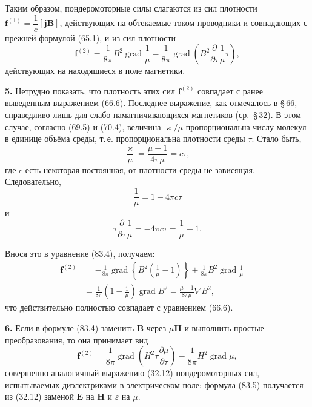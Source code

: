 \documentclass[a4paper,12pt]{article}
\begin{document}

Таким образом, пондеромоторные силы слагаются из сил плотности
$\mathbf{f}^{(1)} = \dfrac{1}{c}[\mathbf{j}\mathbf{B}]$, действующих
на обтекаемые током проводники и совпадающих с прежней формулой (65.1),
и из сил плотности
\begin{equation}
    \mathbf{f}^{(2)} = \frac{1}{8\pi}B^2\operatorname{grad}\frac{1}{\mu}
                     - \frac{1}{8\pi}\operatorname{grad}\!\left(
                         B^2\frac{\partial}{\partial\tau}\frac{1}{\mu}\tau
                     \right),
    \tag{83.4}
\end{equation}
действующих на находящиеся в поле магнетики.

\textbf{5.} Нетрудно показать, что плотность этих сил $\mathbf{f}^{(2)}$
совпадает с ранее выведенным выражением (66.6). Последнее выражение, как
отмечалось в §\,66, справедливо лишь для слабо намагничивающихся
магнетиков (ср.\ §\,32). В этом случае, согласно (69.5) и (70.4),
величина $\varkappa/\mu$ пропорциональна числу молекул в единице объёма
среды, т.\,е. пропорциональна плотности среды $\tau$. Стало быть,
$$
    \frac{\varkappa}{\mu} = \frac{\mu - 1}{4\pi\mu} = c\tau,
$$
где $c$ есть некоторая постоянная, от плотности среды не зависящая.
Следовательно,
$$
    \frac{1}{\mu} = 1 - 4\pi c\tau
$$
и
$$
    \tau\frac{\partial}{\partial\tau}\frac{1}{\mu} = -4\pi c\tau = \frac{1}{\mu} - 1.
$$

Внося это в уравнение (83.4), получаем:
\begin{align*}
    \mathbf{f}^{(2)} &= -\frac{1}{8\pi}\operatorname{grad}\!\left\{
        B^2\!\left(\frac{1}{\mu} - 1\right)
    \right\} + \frac{1}{8\pi}B^2\operatorname{grad}\frac{1}{\mu} = \\
    &= \frac{1}{8\pi}\!\left(1 - \frac{1}{\mu}\right)\operatorname{grad}B^2
     = \frac{\mu - 1}{8\pi\mu}\nabla B^2,
\end{align*}
что действительно полностью совпадает с уравнением (66.6).

\textbf{6.} Если в формуле (83.4) заменить $\mathbf{B}$ через $\mu\mathbf{H}$
и выполнить простые преобразования, то она принимает вид
\begin{equation}
    \mathbf{f}^{(2)} = \frac{1}{8\pi}\operatorname{grad}\!\left(
        H^2\tau\frac{\partial\mu}{\partial\tau}
    \right) - \frac{1}{8\pi}H^2\operatorname{grad}\mu,
    \tag{83.5}
\end{equation}
совершенно аналогичный выражению (32.12) пондеромоторных сил,
испытываемых диэлектриками в электрическом поле: формула (83.5)
получается из (32.12) заменой $\mathbf{E}$ на $\mathbf{H}$ и $\varepsilon$
на $\mu$.
\end{document}
